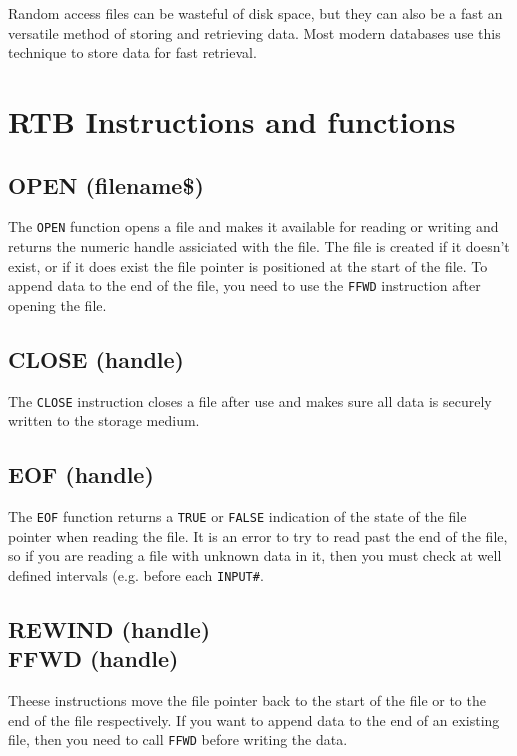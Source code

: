 Random access files can be wasteful of disk space, but they can also
be a fast an versatile method of storing and retrieving data. Most modern
databases use this technique to store data for fast retrieval.

\section{RTB Instructions and functions}

\subsection*{OPEN (filename\$)}
The {\tt OPEN} function opens a file and makes it available for reading
or writing and returns the numeric handle assiciated with the file. The
file is created if it doesn't exist, or if it does exist the file pointer
is positioned at the start of the file. To append data to the end of the
file, you need to use the {\tt FFWD} instruction after opening the file.

\subsection*{CLOSE (handle)}
The {\tt CLOSE} instruction closes a file after use and makes sure all
data is securely written to the storage medium.

\subsection*{EOF (handle)}
The {\tt EOF} function returns a {\tt TRUE} or {\tt FALSE} indication
of the state of the file pointer when reading the file. It is an error
to try to read past the end of the file, so if you are reading a file
with unknown data in it, then you must check at well defined intervals
(e.g. before each {\tt INPUT\#}.

\subsection*{REWIND (handle)\\FFWD (handle)}
Theese instructions move the file pointer back to the start of the file
or to the end of the file respectively. If you want to append data to
the end of an existing file, then you need to call {\tt FFWD} before
writing the data.

